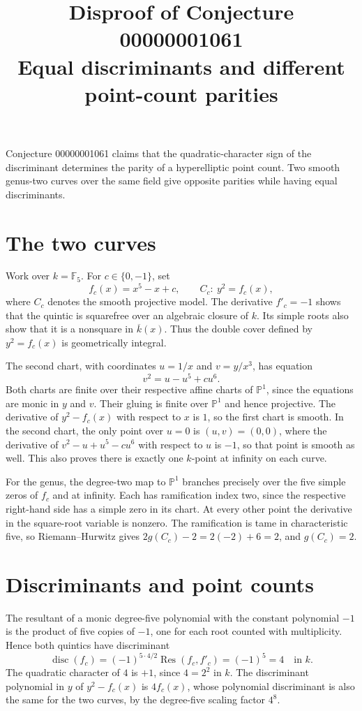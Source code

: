 \documentclass[11pt]{article}
\title{Disproof of Conjecture 00000001061\\
\large Equal discriminants and different point-count parities}
\author{}
\date{}
\begin{document}
\maketitle

Conjecture 00000001061 claims that the quadratic-character sign of the
discriminant determines the parity of a hyperelliptic point count. Two
smooth genus-two curves over the same field give opposite parities while
having equal discriminants.

\section*{The two curves}

Work over \(k=\mathbb F_5\). For \(c\in\{0,-1\}\), set
\[
  f_c(x)=x^5-x+c,\qquad C_c:\ y^2=f_c(x),
\]
where \(C_c\) denotes the smooth projective model. The derivative
\(f'_c=-1\) shows that the quintic is squarefree over an algebraic closure
of \(k\). Its simple roots also show that it is a nonsquare in
\(\overline{k}(x)\). Thus the double cover defined by \(y^2=f_c(x)\)
is geometrically integral.

The second chart, with coordinates \(u=1/x\) and \(v=y/x^3\), has equation
\[
  v^2=u-u^5+c u^6.
\]
Both charts are finite over their respective affine charts of
\(\mathbb P^1\), since the equations are monic in \(y\) and \(v\).
Their gluing is finite over \(\mathbb P^1\) and hence projective.
The derivative of \(y^2-f_c(x)\) with respect to \(x\) is \(1\),
so the first chart is smooth. In the second chart, the only point
over \(u=0\) is \((u,v)=(0,0)\), where the derivative of
\(v^2-u+u^5-cu^6\) with respect to \(u\) is \(-1\), so that point is
smooth as well. This also proves there is exactly one \(k\)-point at
infinity on each curve.

For the genus, the degree-two map to \(\mathbb P^1\) branches precisely
over the five simple zeros of \(f_c\) and at infinity. Each has
ramification index two, since the respective right-hand side has a
simple zero in its chart. At every other point the derivative in the
square-root variable is nonzero. The ramification is tame in
characteristic five, so Riemann--Hurwitz gives
\(2g(C_c)-2=2(-2)+6=2\), and \(g(C_c)=2\).

\section*{Discriminants and point counts}

The resultant of a monic degree-five polynomial with the constant
polynomial \(-1\) is the product of five copies of \(-1\), one for each
root counted with multiplicity. Hence both quintics have discriminant
\[
  \operatorname{disc}(f_c)=(-1)^{5\cdot4/2}
     \operatorname{Res}(f_c,f'_c)=(-1)^5=4 \quad\text{in }k.
\]
The quadratic character of \(4\) is \(+1\), since \(4=2^2\)
in \(k\). The discriminant polynomial in \(y\) of \(y^2-f_c(x)\) is
\(4f_c(x)\), whose polynomial discriminant is also the same for the
two curves, by the degree-five scaling factor \(4^8\).
\end{document}
